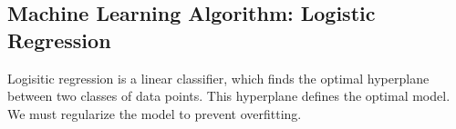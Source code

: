 \documentclass{emulateapj}
\begin{document}


\subsection{Machine Learning Algorithm: Logistic Regression}\label{sec:logreg}

Logisitic regression is a linear classifier, which finds the optimal
hyperplane between two classes of data points.  This hyperplane
defines the optimal model.  We must regularize the model to prevent
overfitting.  
\end{document}
